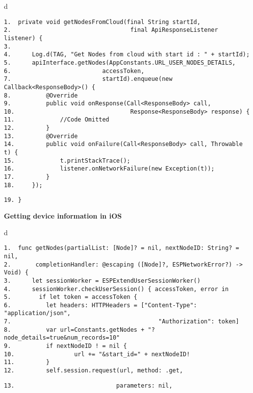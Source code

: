 \documentclass[a4paper,12pt]{book}
\begin{document}
\begin{codebloc}
\begin{tabular}{d}
\vspace{2pt}
\begin{verbatim}
1.  private void getNodesFromCloud(final String startId,
2.                                  final ApiResponseListener listener) {
3.
4.      Log.d(TAG, "Get Nodes from cloud with start id : " + startId);
5.      apiInterface.getNodes(AppConstants.URL_USER_NODES_DETAILS, 
6.                          accessToken,
7.                          startId).enqueue(new Callback<ResponseBody>() {
8.          @Override
9.          public void onResponse(Call<ResponseBody> call,
10.                                 Response<ResponseBody> response) {
11.             //Code Omitted
12.         }
13.         @Override
14.         public void onFailure(Call<ResponseBody> call, Throwable t) {
15.             t.printStackTrace();
16.             listener.onNetworkFailure(new Exception(t));
17.         }
18.     });
\end{verbatim}
\verb|19. }|
\end{tabular}
\end{codebloc}

\vspace{3pt}
\textbf{Getting device information in iOS}


\begin{codebloc}
\begin{tabular}{d}
\vspace{2pt}
\begin{verbatim}
1.  func getNodes(partialList: [Node]? = nil, nextNodeID: String? = nil,
2.       completionHandler: @escaping ([Node]?, ESPNetworkError?) -> Void) {
3.      let sessionWorker = ESPExtendUserSessionWorker()
4.      sessionWorker.checkUserSession() { accessToken, error in
5.        if let token = accessToken {
6.          let headers: HTTPHeaders = ["Content-Type": "application/json",
7.                                          "Authorization": token]
8.          var url=Constants.getNodes + "?node_details=true&num_records=10"
9.          if nextNodeID ! = nil {
10.                 url += "&start_id=" + nextNodeID!
11.         }
12.         self.session.request(url, method: .get, 
\end{verbatim}
\verb|13.                             parameters: nil,|
\end{tabular}
\end{codebloc}
\end{document}
